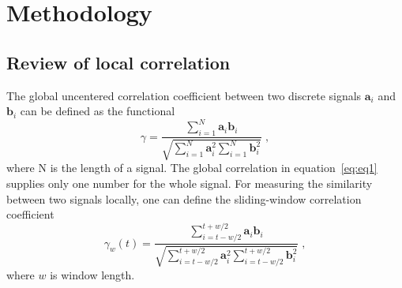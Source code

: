 \section{Methodology}

 \subsection{Review of local correlation}

The global uncentered correlation coefficient between two discrete
signals $\mathbf{a}_i$ and $\mathbf{b}_i$ can be defined as the functional
      \begin{equation}
          \gamma = \frac{\displaystyle\sum_{i=1}^{N}\mathbf{a}_i \mathbf{b}_i}{\sqrt{\displaystyle\sum_{i=1}^{N}\mathbf{a}^2_i \sum_{i=1}^{N}\mathbf{b}^2_i}}\;,
        \label{eq:eq1}
      \end{equation}
where N is the length of a signal. The global correlation in equation~\ref{eq:eq1}
supplies only one number for the whole signal. For measuring the
similarity between two signals locally, one can define the sliding-window
correlation coefficient
      \begin{equation}
          \gamma_w(t) = \frac{\displaystyle\sum_{i=t-w/2}^{t+w/2} \mathbf{a}_i \mathbf{b}_i}{\sqrt{\displaystyle\sum_{i=t-w/2}^{t+w/2} \mathbf{a}_i^2 \displaystyle\sum_{i=t-w/2}^{t+w/2} \mathbf{b}_i^2 }}\;,
        \label{eq:eq2}
      \end{equation}
where $w$ is window length.

